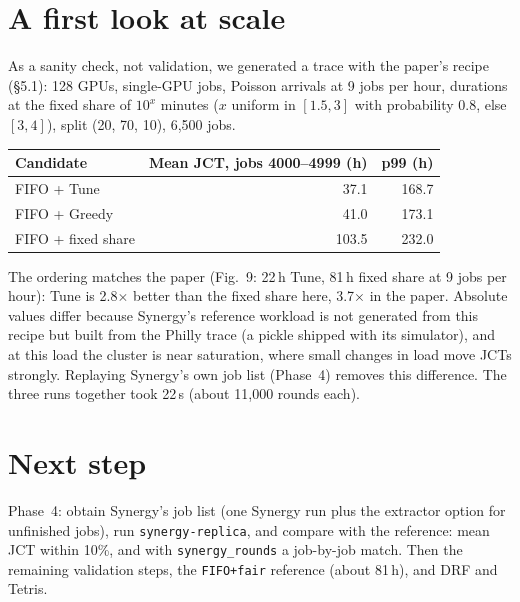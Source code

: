 \documentclass[11pt,a4paper]{article}
\newcommand{\code}[1]{\texttt{#1}}
\begin{document}
\section{A first look at scale}

As a sanity check, not validation, we generated a trace with the paper's recipe (\S5.1): 128 GPUs,
single-GPU jobs, Poisson arrivals at 9 jobs per hour, durations at the fixed share of \(10^x\) minutes
(\(x\) uniform in \([1.5, 3]\) with probability 0.8, else \([3, 4]\)), split (20, 70, 10), 6{,}500 jobs.

\begin{center}
\begin{tabular}{@{}lrr@{}}
\toprule
Candidate & Mean JCT, jobs 4000--4999 (h) & p99 (h) \\
\midrule
FIFO + Tune & 37.1 & 168.7 \\
FIFO + Greedy & 41.0 & 173.1 \\
FIFO + fixed share & 103.5 & 232.0 \\
\bottomrule
\end{tabular}
\end{center}

The ordering matches the paper (Fig.~9: 22\,h Tune, 81\,h fixed share at 9 jobs per hour): Tune is
2.8\(\times\) better than the fixed share here, 3.7\(\times\) in the paper. Absolute values differ because
Synergy's reference workload is not generated from this recipe but built from the Philly trace (a pickle
shipped with its simulator), and at this load the cluster is near saturation, where small changes in load
move JCTs strongly. Replaying Synergy's own job list (Phase~4) removes this difference. The three runs
together took 22\,s (about 11{,}000 rounds each).

\section{Next step}
Phase~4: obtain Synergy's job list (one Synergy run plus the extractor option for unfinished jobs), run
\code{synergy-replica}, and compare with the reference: mean JCT within 10\%, and with
\code{synergy\_rounds} a job-by-job match. Then the remaining validation steps, the \code{FIFO+fair}
reference (about 81\,h), and DRF and Tetris.
\end{document}
